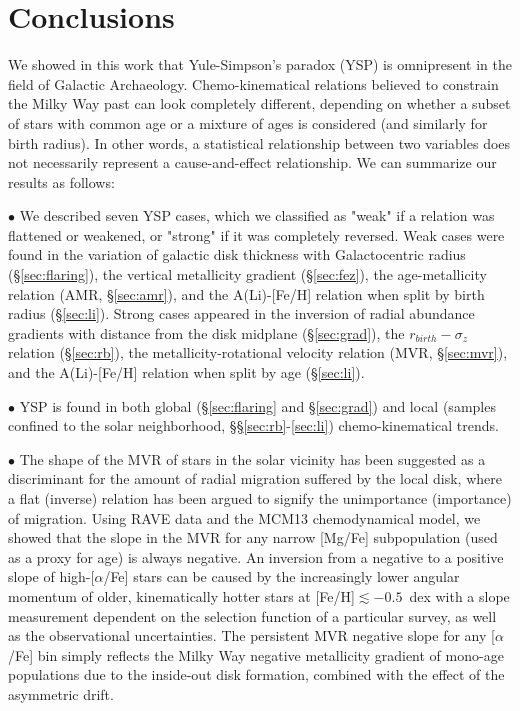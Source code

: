 \documentclass[usenatbib]{mnras}
\begin{document}
\section{Conclusions}

We showed in this work that Yule-Simpson's paradox (YSP) is omnipresent in the field of Galactic Archaeology. Chemo-kinematical relations believed to constrain the Milky Way past can look completely different, depending on whether a subset of stars with common age or a mixture of ages is considered (and similarly for birth radius). In other words, a statistical relationship between two variables does not necessarily represent a cause-and-effect relationship. 
We can summarize our results as follows:

$\bullet$ We described seven YSP cases, which we classified as "weak" if a relation was flattened or weakened, or "strong" if it was completely reversed. Weak cases were found in the variation of galactic disk thickness with Galactocentric radius (\S\ref{sec:flaring}), the vertical metallicity gradient (\S\ref{sec:fez}), the age-metallicity relation (AMR, \S\ref{sec:amr}), and the A(Li)-[Fe/H] relation when split by birth radius (\S\ref{sec:li}). Strong cases appeared in the inversion of radial abundance gradients with distance from the disk midplane (\S\ref{sec:grad}), the $r_{birth}-\sigma_z$ relation (\S\ref{sec:rb}), the metallicity-rotational velocity relation (MVR, \S\ref{sec:mvr}), and the A(Li)-[Fe/H] relation when split by age (\S\ref{sec:li}).

$\bullet$ YSP is found in both global (\S\ref{sec:flaring} and \S\ref{sec:grad}) and local (samples confined to the solar neighborhood, \S\S\ref{sec:rb}-\ref{sec:li}) chemo-kinematical trends.

$\bullet$ The shape of the MVR of stars in the solar vicinity has been suggested as a discriminant for the amount of radial migration suffered by the local disk, where a flat (inverse) relation has been argued to signify the unimportance (importance) of migration. Using RAVE data and the MCM13 chemodynamical model, we showed that the slope in the MVR for any narrow [Mg/Fe] subpopulation (used as a proxy for age) is always negative. An inversion from a negative to a positive slope of high-[$\alpha$/Fe] stars can be caused by the increasingly lower angular momentum of older, kinematically hotter stars at [Fe/H]$\lesssim-0.5$~dex with a slope measurement dependent on the selection function of a particular survey, as well as the observational uncertainties. The persistent MVR negative slope for any [$\alpha$/Fe] bin simply reflects the Milky Way negative metallicity gradient of mono-age populations due to the inside-out disk formation, combined with the effect of the asymmetric drift.
\end{document}
